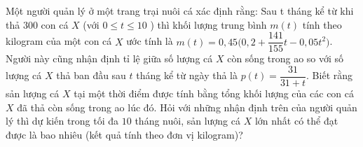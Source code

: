 \begin{ex}%
	Một người quản lý ở một trang trại nuôi cá xác định rằng: Sau t tháng kể từ khi thả $300$ con cá $X$ (với $0 \leq t\leq 10$ ) thì khối lượng trung bình $m(t)$ tính theo kilogram của một con cá $X$ ước tính là $m(t)=0{,}45\Big(0{,}2+\dfrac{141}{155}t-0{,}05t^2\Big)$. Người này cũng nhận định tỉ lệ giữa số lượng cá $X$ còn sống trong ao so với số lượng cá $X$ thả ban đầu sau $t$ tháng kể từ ngày thả là $p(t)=\dfrac{31}{31+t}$. Biết rằng sản lượng cá $X$ tại một thời điểm được tính bằng tổng khối lượng của các con cá $X$ đã thả còn sống trong ao lúc đó. Hỏi với những nhận định trên của người quản lý thì dự kiến trong tối đa $10$ tháng nuôi, sản lượng cá $X$ lớn nhất có thể đạt được là bao nhiêu (kết quả tính theo đơn vị kilogram)?
\end{ex}

